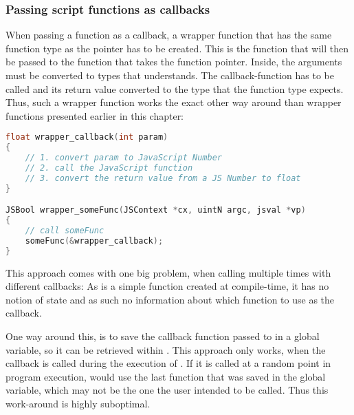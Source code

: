 \subsubsection{Passing script functions as callbacks}

When passing a  function as a callback, a wrapper function that has the same function type as the pointer has to be created. This is the  function that will then be passed to the function that takes the function pointer. Inside, the  arguments must be converted to types that  understands. The  callback-function has to be called and its return value converted to the  type that the function type expects. Thus, such a wrapper function works the exact other way around than wrapper functions presented earlier in this chapter:

\SingleSpacing
\begin{lstlisting}[language=C++, caption=Wrapper code for handling methods that take function pointers \#1]
float wrapper_callback(int param)
{
	// 1. convert param to JavaScript Number
	// 2. call the JavaScript function
	// 3. convert the return value from a JS Number to float
}

JSBool wrapper_someFunc(JSContext *cx, uintN argc, jsval *vp)
{
	// call someFunc
	someFunc(&wrapper_callback);
}
\end{lstlisting}
\OnehalfSpacing

This approach comes with one big problem, when calling  multiple times with different  callbacks: As  is a simple  function created at compile-time, it has no notion of state and as such no information about which  function to use as the callback.

One way around this, is to save the  callback function passed to \linebreak{} in a global variable, so it can be retrieved within . This approach only works, when the callback is called during the execution of . If it is called at a random point in program execution,  would use the last  function that was saved in the global variable, which may not be the one the user intended to be called. Thus this work-around is highly suboptimal.

